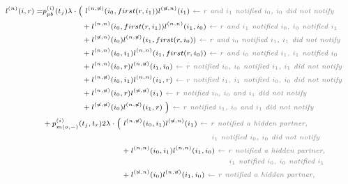 \documentclass[a4paper,10pt]{article}
\begin{document}
 
\begin{equation}
\scriptsize
\begin{split}
l^{(n)}(i, r) = &p_{pb}^{(i)}(t_j) \lambda \cdot
\Big(~l^{(n,\not{n})}(i_0,first(r,i_1))l^{(\not{n},n)}(i_1) \textit{\color{gray}~$\leftarrow$ $r$ and $i_1$ notified $i_0$, $i_0$ did not notify} \\
&~~~~~~~~~~~~~~~+ l^{(n,n)}(i_0,first(r,i_1))l^{(n,n)}(i_1, i_0) \textit{\color{gray}~$\leftarrow$ $r$ and $i_1$ notified $i_0$, $i_0$ notified $i_1$} \\
&~~~~~~~~~~~~~~~+l^{(\not{n},n)}(i_0)l^{(n,\not{n})}(i_1,first(r,i_0)) \textit{\color{gray}~$\leftarrow$ $r$ and $i_0$ notified $i_1$, $i_1$ did not notify} \\
&~~~~~~~~~~~~~~~+ l^{(n,n)}(i_0, i_1)l^{(n,n)}(i_1,first(r,i_0)) \textit{\color{gray}~$\leftarrow$ $r$ and $i_0$ notified $i_1$, $i_1$ notified $i_0$} \\
&~~~~~~~~~~~~~~~+l^{(n,n)}(i_0,r)l^{(n,\not{n})}(i_1, i_0) \textit{\color{gray}~$\leftarrow$ $r$ notified $i_0$, $i_0$ notified $i_1$, $i_1$ did not notify} \\
&~~~~~~~~~~~~~~~+ l^{(n,\not{n})}(i_0, i_1)l^{(n,n)}(i_1,r) \textit{\color{gray}~$\leftarrow$ $r$ notified $i_1$, $i_1$ notified $i_0$, $i_0$ did not notify} \\
&~~~~~~~~~~~~~~~+l^{(n,\not{n})}(i_0,r)l^{(\not{n},\not{n})}(i_1) \textit{\color{gray}~$\leftarrow$ $r$ notified $i_0$, $i_0$ and $i_1$ did not notify} \\
&~~~~~~~~~~~~~~~+ l^{(\not{n},\not{n})}(i_0)l^{(n,\not{n})}(i_1,r)~\Big) \textit{\color{gray}~$\leftarrow$ $r$ notified $i_1$, $i_0$ and $i_1$ did not notify} 
\\
&+ p_{m(o,-)}^{(i)}(t_j,t_r) 2 \lambda \cdot
\Big(~l^{(n,\not{n})}(i_0,i_1)l^{(\not{n},n)}(i_1) \textit{\color{gray}~$\leftarrow$ $r$ notified a hidden partner,} \\
&\textit{\color{gray}~~~~~~~~~~~~~~~~~~~~~~~~~~~~~~~~~~~~~~~~~~~~~~~~~~~~~~~~~~$i_1$ notified $i_0$, $i_0$ did not notify} \\
&~~~~~~~~~~~~~~~~~~~~~~~~~~~~~~+ l^{(n,n)}(i_0,i_1)l^{(n,n)}(i_1, i_0)\textit{\color{gray}~$\leftarrow$ $r$ notified a hidden partner,} \\
&\textit{\color{gray}~~~~~~~~~~~~~~~~~~~~~~~~~~~~~~~~~~~~~~~~~~~~~~~~~~~~~~~~~~~~~~~~$i_1$ notified $i_0$, $i_0$ notified $i_1$} \\
&~~~~~~~~~~~~~~~~~~~~~~~~~~~~~~+l^{(\not{n},n)}(i_0)l^{(n,\not{n})}(i_1,i_0) \textit{\color{gray}~$\leftarrow$ $r$ notified a hidden partner,} \\

\end{split}
\end{equation}
\end{document}

